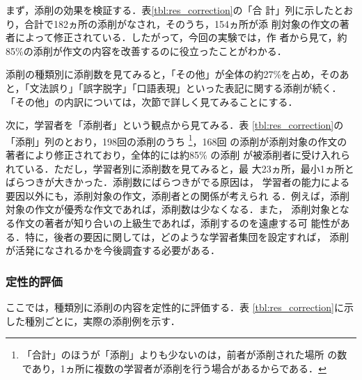 \documentclass[japanese]{jnlp_1.4}
\begin{document}
まず，添削の効果を検証する．表\ref{tbl:res_correction}の「合
計」列に示したとおり，合計で182ヵ所の添削がなされ，そのうち，154ヵ所が添
削対象の作文の著者によって修正されている．したがって，今回の実験では，作
者から見て，約85\%の添削が作文の内容を改善するのに役立ったことがわかる．

添削の種類別に添削数を見てみると，「その他」が全体の約27\%を占め，そのあ
と，「文法誤り」「誤字脱字」「口語表現」といった表記に関する添削が続く．
「その他」の内訳については，次節で詳しく見てみることにする．

次に，学習者を「添削者」という観点から見てみる．表
\ref{tbl:res_correction}の「添削」列のとおり，198回の添削のうち
\footnote{「合計」のほうが「添削」よりも少ないのは，前者が添削された場所
の数であり，1ヵ所に複数の学習者が添削を行う場合があるからである．}，168回
の添削が添削対象の作文の著者により修正されており，全体的には約85\% の添削
が被添削者に受け入れられている．ただし，学習者別に添削数を見てみると，最
大23ヵ所，最小1ヵ所とばらつきが大きかった．添削数にばらつきがでる原因は，
学習者の能力による要因以外にも，添削対象の作文，添削者との関係が考えられ
る．例えば，添削対象の作文が優秀な作文であれば，添削数は少なくなる．また，
添削対象となる作文の著者が知り合いの上級生であれば，添削するのを遠慮する可
能性がある．特に，後者の要因に関しては，どのような学習者集団を設定すれば，
添削が活発になされるかを今後調査する必要がある．


\subsubsection{定性的評価}

ここでは，種類別に添削の内容を定性的に評価する．表
\ref{tbl:res_correction}に示した種別ごとに，実際の添削例を示す．
\end{document}
